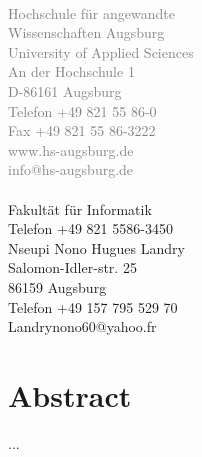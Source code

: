 \documentclass[a4paper,12pt]{report}
\begin{document}
\begin{titlepage}
{\begin{minipage}{15cm}
{		\tiny{\textcolor{gray}{~\\
			\hspace{11.3cm} Hochschule für angewandte \\
			\hspace{11.3cm} Wissenschaften Augsburg \\
			\hspace{11.3cm} University of Applied Sciences \\
			\hspace{11.3cm} An der Hochschule 1 \\
			\hspace{11.3cm} D-86161 Augsburg \\
			\hspace{11.3cm} Telefon +49 821 55 86-0 \\
			\hspace{11.3cm} Fax +49 821 55 86-3222 \\
			\hspace{11.3cm} www.hs-augsburg.de \\
			\hspace{11.3cm} info@hs-augsburg.de\\
			}~\\
			\hspace{11.3cm} Fakultät für Informatik \\
			\hspace{11.3cm} Telefon +49 821 5586-3450 \\
  		\hspace{11.3cm} Nseupi Nono Hugues Landry \\
	  	\hspace{11.3cm} Salomon-Idler-str. 25 \\
			\hspace{11.3cm} 86159 Augsburg \\
			\hspace{11.3cm} Telefon +49 157 795 529 70 \\
			\hspace{11.3cm} Landrynono60@yahoo.fr \\
	}}
\end{minipage}}\par
\end{titlepage}



\thispagestyle{empty}
\section*{Abstract}
...

\newpage
\tableofcontents
\newpage
{}




%
%
%
%
%
%
\end{document}

